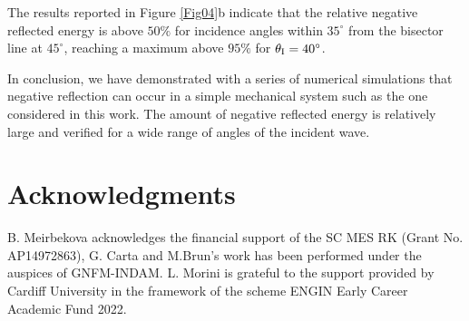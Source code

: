 \documentclass[10p]{article}
\begin{document}
The results reported in Figure \ref{Fig04}b indicate that the relative negative reflected energy is above $50\%$ for incidence angles within $35^\circ$ from the bisector line at $45^\circ$, reaching a maximum above $95\%$ for $\theta_\textup{I}=40^\circ$.

In conclusion, we have demonstrated with a series of numerical simulations that negative reflection can occur in a simple mechanical system such as the one considered in this work. The amount of negative reflected energy is relatively large and verified for a wide range of angles of the incident wave. 

\section*{Acknowledgments}
B. Meirbekova acknowledges the financial support of the SC MES RK (Grant No. AP14972863), G. Carta and M.Brun's work has been performed under the auspices of GNFM-INDAM. L. Morini is grateful to the support provided by Cardiff University in the framework of the  scheme  ENGIN  Early  Career Academic Fund 2022.



%
%
\end{document}
